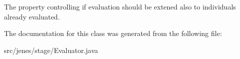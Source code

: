 The property controlling if evaluation should be extened also to individuals already evaluated. 

The documentation for this class was generated from the following file:\begin{CompactItemize}
\item 
src/jenes/stage/Evaluator.java\end{CompactItemize}
